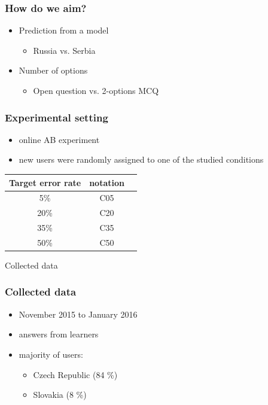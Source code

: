 \documentclass[bigger]{beamer}
\begin{document}
\begin{frame}
	\frametitle{How do we aim?}
	\begin{itemize}
		\item Prediction from a model
    \begin{itemize}
      \item Russia vs. Serbia
    \end{itemize}
		\item Number of options
    \begin{itemize}
      \item Open question vs. 2-options MCQ
    \end{itemize}
	\end{itemize}
\end{frame}

\begin{frame}
  \frametitle{Experimental setting}
	\begin{itemize}
		\item online AB experiment
		\item new users were randomly assigned to one of the studied conditions
	\end{itemize}
	\begin{center}
		\begin{tabular}{ccc}
			\textbf{Target error rate} & \textbf{notation} \\
			\toprule
			 5\% & C05 \\
			 20\%   & C20 \\
			 35\% & C35 \\
			 50\%   & C50 \\
			\bottomrule
		\end{tabular}
	\end{center}
\end{frame}

\begin{frame}
	\begin{center}
    {\Huge Collected data} 
	\end{center}
\end{frame}

\begin{frame}
	\frametitle{Collected data}
	\begin{itemize}
		\item November 2015 to January 2016
		\item {} answers from  learners
		\item majority of users:
			\begin{itemize}
				\item Czech Republic (84 \%)
				\item Slovakia (8 \%)
			\end{itemize}
	\end{itemize}
\end{frame}
\end{document}
